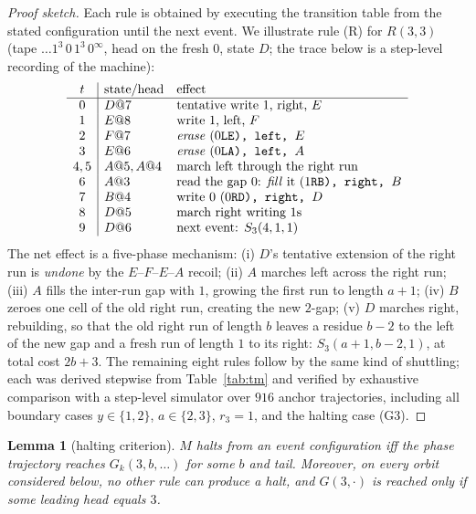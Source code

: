 \documentclass[11pt]{amsart}
\newtheorem{lemma}[theorem]{Lemma}
\theoremstyle{definition}
\begin{document}
\begin{proof}[Proof sketch]
Each rule is obtained by executing the transition table from the stated
configuration until the next event. We illustrate rule (R) for $R(3,3)$
(tape $\dots1^3\,0\,1^3\,0^\infty$, head on the fresh $0$, state $D$;
the trace below is a step-level recording of the machine):
\[
\begin{array}{c|ll}
t & \text{state/head} & \text{effect}\\\hline
0 & D@7 & \text{tentative write }1\text{, right, }E\\
1 & E@8 & \text{write }1\text{, left, }F\\
2 & F@7 & \text{\emph{erase} (}0\texttt{LE), left, }E\\
3 & E@6 & \text{\emph{erase} (}0\texttt{LA), left, }A\\
4,5 & A@5,A@4 & \text{march left through the right run}\\
6 & A@3 & \text{read the gap }0\text{: \emph{fill} it (}1\texttt{RB), right, }B\\
7 & B@4 & \text{write }0\text{ (}0\texttt{RD), right, }D\\
8 & D@5 & \text{march right writing }1\text{s}\\
9 & D@6 & \text{next event: }S_3(4,1,1)
\end{array}
\]
The net effect is a five-phase mechanism: (i) $D$'s tentative extension of
the right run is \emph{undone} by the $E$--$F$--$E$--$A$ recoil; (ii) $A$
marches left across the right run; (iii) $A$ fills the inter-run gap with
$1$, growing the first run to length $a{+}1$; (iv) $B$ zeroes one cell of
the old right run, creating the new $2$-gap; (v) $D$ marches right,
rebuilding, so that the old right run of length $b$ leaves a residue $b-2$
to the left of the new gap and a fresh run of length $1$ to its right:
$S_3(a+1,b-2,1)$, at total cost $2b+3$. The remaining eight rules follow
by the same kind of shuttling; each was derived stepwise from
Table~\ref{tab:tm} and verified by exhaustive comparison with a
step-level simulator over $916$ anchor trajectories, including all
boundary cases $y\in\{1,2\}$, $a\in\{2,3\}$, $r_3=1$, and the halting case
(G3).
\end{proof}

\begin{lemma}[halting criterion]\label{lem:halt}
$M$ halts from an event configuration iff the phase trajectory reaches
$G_k(3,b,\dots)$ for some $b$ and tail. Moreover, on every orbit
considered below, no other rule can produce a halt, and $G(3,\cdot)$ is
reached only if some leading head equals $3$.
\end{lemma}
\end{document}
